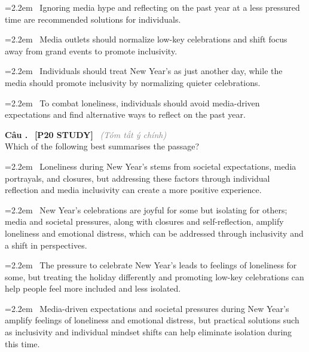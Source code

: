 \documentclass[12pt,a4paper,twoside]{article}
\newcounter{qcounter}
\newcommand{\question}[2][]{%
    \stepcounter{qcounter}%
    \par\vspace{6pt}%
    \noindent\textcolor{primaryBlue}{\textbf{Câu \theqcounter.}}~%
    \textcolor{secondaryBlue}{\small\textbf{[P20 STUDY]}}~%
    \if\relax\detokenize{#1}\relax\else\textcolor{gray}{\small\textit{(#1)}}~\fi\\[1pt]
    \noindent #2%
}
\newcommand{\choiceitem}[2]{%
    \tikz[baseline=-0.5ex]{%
        \node[draw=primaryBlue, circle, minimum size=1.5em, inner sep=0pt, thick] {\textbf{#1}};%
    }~#2%
}
\begin{document}
\par\vspace{4pt}
\noindent\hangindent=2.2em\choiceitem{A}{Ignoring media hype and reflecting on the past year at a less pressured time are recommended solutions for individuals.}\par\vspace{4pt}
\noindent\hangindent=2.2em\choiceitem{B}{Media outlets should normalize low-key celebrations and shift focus away from grand events to promote inclusivity.}\par\vspace{4pt}
\noindent\hangindent=2.2em\choiceitem{C}{Individuals should treat New Year’s as just another day, while the media should promote inclusivity by normalizing quieter celebrations.}\par\vspace{4pt}
\noindent\hangindent=2.2em\choiceitem{D}{To combat loneliness, individuals should avoid media-driven expectations and find alternative ways to reflect on the past year.}\par\vspace{4pt}

\question[Tóm tắt ý chính]{Which of the following best summarises the passage?}

\par\vspace{4pt}
\noindent\hangindent=2.2em\choiceitem{A}{Loneliness during New Year's stems from societal expectations, media portrayals, and closures, but addressing these factors through individual reflection and media inclusivity can create a more positive experience.}\par\vspace{4pt}
\noindent\hangindent=2.2em\choiceitem{B}{New Year’s celebrations are joyful for some but isolating for others; media and societal pressures, along with closures and self-reflection, amplify loneliness and emotional distress, which can be addressed through inclusivity and a shift in perspectives.}\par\vspace{4pt}
\noindent\hangindent=2.2em\choiceitem{C}{The pressure to celebrate New Year’s leads to feelings of loneliness for some, but treating the holiday differently and promoting low-key celebrations can help people feel more included and less isolated.}\par\vspace{4pt}
\noindent\hangindent=2.2em\choiceitem{D}{Media-driven expectations and societal pressures during New Year’s amplify feelings of loneliness and emotional distress, but practical solutions such as inclusivity and individual mindset shifts can help eliminate isolation during this time.}\par\vspace{4pt}
\end{document}
